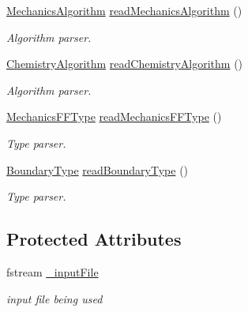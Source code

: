 {\bf }\par
\begin{DoxyCompactItemize}
\item 
\hyperlink{structMechanicsAlgorithm}{Mechanics\+Algorithm} \hyperlink{classSystemParser_a93017271d75297c49a49e08871fa29e9}{read\+Mechanics\+Algorithm} ()
\begin{DoxyCompactList}\small\item\em Algorithm parser. \end{DoxyCompactList}\item 
\hyperlink{structChemistryAlgorithm}{Chemistry\+Algorithm} \hyperlink{classSystemParser_aa4dc61cfb269e17ae8adcfe58a2d41de}{read\+Chemistry\+Algorithm} ()
\begin{DoxyCompactList}\small\item\em Algorithm parser. \end{DoxyCompactList}\end{DoxyCompactItemize}

{\bf }\par
\begin{DoxyCompactItemize}
\item 
\hyperlink{structMechanicsFFType}{Mechanics\+F\+F\+Type} \hyperlink{classSystemParser_a4f4f2aafdb994a6e301f72874cc5c7d7}{read\+Mechanics\+F\+F\+Type} ()
\begin{DoxyCompactList}\small\item\em Type parser. \end{DoxyCompactList}\item 
\hyperlink{structBoundaryType}{Boundary\+Type} \hyperlink{classSystemParser_a722843391cea1893b49b55e9670b3c5a}{read\+Boundary\+Type} ()
\begin{DoxyCompactList}\small\item\em Type parser. \end{DoxyCompactList}\end{DoxyCompactItemize}

\subsection*{Protected Attributes}
\begin{DoxyCompactItemize}
\item 
fstream \hyperlink{classParser_adc64c51d84a8fe723f7b4f13ca4d37cd}{\+\_\+input\+File}
\begin{DoxyCompactList}\small\item\em input file being used \end{DoxyCompactList}\end{DoxyCompactItemize}


